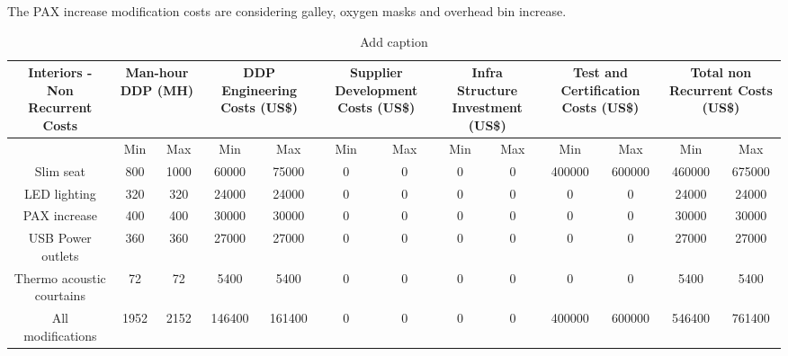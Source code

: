﻿The PAX increase modification costs are considering galley, oxygen masks and overhead bin increase.


\begin{table}[htbp]
  \centering
  \caption{Add caption}
    \begin{tabular}{ccccccccccccc}
    \toprule
    \multirow{2}[4]{*}{Interiors - Non Recurrent Costs} & \multicolumn{2}{c}{Man-hour DDP (MH)} & \multicolumn{2}{c}{DDP Engineering Costs (US\$)} & \multicolumn{2}{c}{Supplier Development Costs (US\$)} & \multicolumn{2}{c}{Infra Structure Investment (US\$)} & \multicolumn{2}{c}{Test and Certification Costs (US\$)} & \multicolumn{2}{c}{Total non Recurrent Costs (US\$)} \\
    \midrule
          & Min   & Max   & Min   & Max   & Min   & Max   & Min   & Max   & Min   & Max   & Min   & Max \\
    Slim seat & 800   & 1000  & 60000 & 75000 & 0     & 0     & 0     & 0     & 400000 & 600000 & 460000 & 675000 \\
    LED lighting & 320   & 320   & 24000 & 24000 & 0     & 0     & 0     & 0     & 0     & 0     & 24000 & 24000 \\
    PAX increase & 400   & 400   & 30000 & 30000 & 0     & 0     & 0     & 0     & 0     & 0     & 30000 & 30000 \\
    USB Power outlets & 360   & 360   & 27000 & 27000 & 0     & 0     & 0     & 0     & 0     & 0     & 27000 & 27000 \\
    Thermo acoustic courtains & 72    & 72    & 5400  & 5400  & 0     & 0     & 0     & 0     & 0     & 0     & 5400  & 5400 \\
    All modifications & 1952  & 2152  & 146400 & 161400 & 0     & 0     & 0     & 0     & 400000 & 600000 & 546400 & 761400 \\
    \bottomrule
    \end{tabular}%
  \label{tab:addlabel}%
\end{table}%






